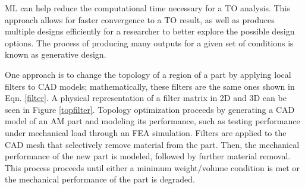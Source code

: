 ML can help reduce the computational time necessary for a TO analysis. This approach allows for faster convergence to a TO result, as well as produces multiple designs efficiently for a researcher to better explore the possible design options. The process of producing many outputs for a given set of conditions is known as generative design.

One approach is to change the topology of a region of a part by applying local filters to CAD models; mathematically, these filters are the same ones shown in Eqn. \ref{filter}.  A physical representation of a filter matrix in 2D and 3D can be seen in Figure \ref{topfilter}. Topology optimization proceeds by generating a CAD model of an AM part and modeling its performance, such as testing performance under mechanical load through an FEA simulation. Filters are applied to the CAD mesh that selectively remove material from the part. Then, the mechanical performance of the new part is modeled, followed by further material removal. This process proceeds until either a minimum weight/volume condition is met or the mechanical performance of the part is degraded.


